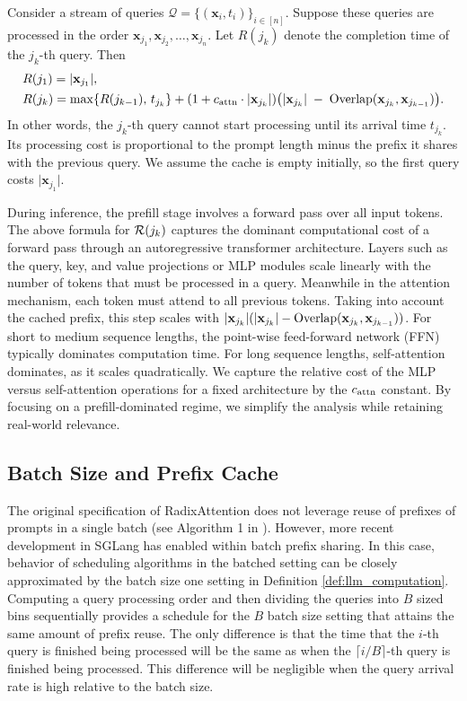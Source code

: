 \begin{definition}\label{def:llm_computation}
Consider a stream of queries $\mathcal{Q} = \{(\mathbf{x}_i, t_i)\}_{i \in [n]}$. Suppose these queries are processed in the order $\mathbf{x}_{j_1}, \mathbf{x}_{j_2}, \ldots, \mathbf{x}_{j_n}$. Let $R(j_k)$ denote the completion time of the $j_k$-th query. Then
\begin{align*}
  R&(j_1) = \lvert \mathbf{x}_{j_1}\rvert, \\
  R&(j_k) = \max\{ R(j_{k-1}),\, t_{j_k} \} +(1+c_{\mathrm{attn}} \cdot\lvert \mathbf{x}_{j_k}\rvert)  \bigl(\lvert \mathbf{x}_{j_k}\rvert
  \;-\; \operatorname{Overlap}(\mathbf{x}_{j_k}, \mathbf{x}_{j_{k-1}})\bigr).
\end{align*}
In other words, the $j_k$-th query cannot start processing until its arrival time $t_{j_k}$. Its processing cost is proportional to the prompt length minus the prefix it shares with the previous query. We assume the cache is empty initially, so the first query costs $\lvert \mathbf{x}_{j_1}\rvert$.
\end{definition}

During inference, the prefill stage involves a forward pass over all input tokens. The above formula for $\mathcal{R}(j_k)$ captures the dominant computational cost of a forward pass through an autoregressive transformer architecture. Layers such as the query, key, and value projections or MLP modules scale linearly with the number of tokens that must be processed in a query. Meanwhile in the attention mechanism, each token must attend to all previous tokens. Taking into account the cached prefix, this step scales with $|\mathbf{x}_{j_k}|(|\mathbf{x}_{j_k}| - \operatorname{Overlap}(\mathbf{x}_{j_k}, \mathbf{x}_{j_{k-1}}))$. For short to medium sequence lengths, the point-wise feed-forward network (FFN) typically dominates computation time. For long sequence lengths, self-attention dominates, as it scales quadratically. We capture the relative cost of the MLP versus self-attention operations for a fixed architecture by the $c_{\mathrm{attn}}$ constant. By focusing on a prefill-dominated regime, we simplify the analysis while retaining real-world relevance.


\subsection{Batch Size and Prefix Cache}

The original specification of RadixAttention does not leverage reuse of prefixes of prompts in a single batch (see Algorithm 1 in \cite{zheng2024sglang}).
However, more recent development in SGLang has enabled within batch prefix sharing. In this case, behavior of scheduling algorithms in the batched setting can be closely approximated by the batch size one setting in Definition \ref{def:llm_computation}. Computing a query processing order and then dividing the queries into $B$ sized bins sequentially provides a schedule for the $B$ batch size setting that attains the same amount of prefix reuse. The only difference is that the time that the $i$-th query is finished being processed will be the same as when the $\lceil i /B \rceil$-th query is finished being processed. This difference will be negligible when the query arrival rate is high relative to the batch size.

